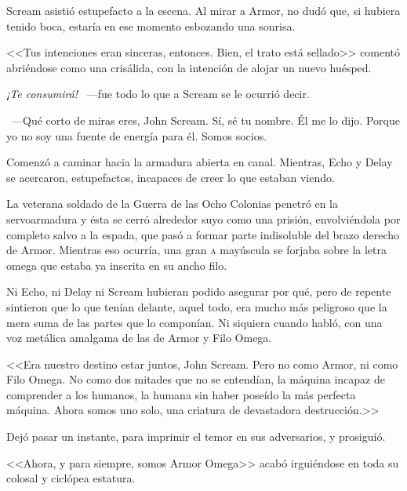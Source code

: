 Scream asistió estupefacto a la escena. Al mirar a Armor, no dudó que, si hubiera tenido boca, estaría en ese momento esbozando una sonrisa.

<<Tus intenciones eran sinceras, entonces. Bien, el trato está sellado>> comentó abriéndose como una crisálida, con la intención de alojar un nuevo huésped.

\emph{¡Te consumirá!} ~---fue todo lo que a Scream se le ocurrió decir.

~---Qué corto de miras eres, John Scream. Sí, sé tu nombre. Él me lo dijo. Porque yo no soy una fuente de energía para él. Somos socios.

Comenzó a caminar hacia la armadura abierta en canal. Mientras, Echo y Delay se acercaron, estupefactos, incapaces de creer lo que estaban viendo.

La veterana soldado de la Guerra de las Ocho Colonias penetró en la servoarmadura y ésta se cerró alrededor suyo como una prisión, envolviéndola por completo salvo a la espada, que pasó a formar parte indisoluble del brazo derecho de Armor. Mientras eso ocurría, una gran \textsc{a} mayúscula se forjaba sobre la letra omega que estaba ya inscrita en su ancho filo.

Ni Echo, ni Delay ni Scream hubieran podido asegurar por qué, pero de repente sintieron que lo que tenían delante, aquel todo, era mucho más peligroso que la mera suma de las partes que lo componían. Ni siquiera cuando habló, con una voz metálica amalgama de las de Armor y Filo Omega.

<<Era nuestro destino estar juntos, John Scream. Pero no como Armor, ni como Filo Omega. No como dos mitades que no se entendían, la máquina incapaz de comprender a los humanos, la humana sin haber poseído la más perfecta máquina. Ahora somos uno solo, una criatura de devastadora destrucción.>>

Dejó pasar un instante, para imprimir el temor en sus adversarios, y prosiguió.

<<Ahora, y para siempre, somos Armor Omega>> acabó irguiéndose en toda su colosal y ciclópea estatura.

\endinput
